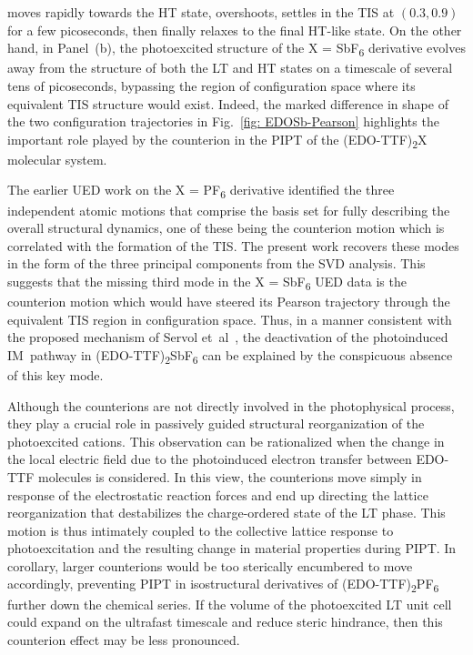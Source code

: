 moves rapidly towards the HT state, overshoots, settles in the TIS at $(0.3, 0.9)$
for a few picoseconds, then finally relaxes to the final HT-like state.
%
On the other hand, in Panel~(b), the photoexcited structure of the X = SbF\textsubscript{6} derivative
evolves away from the structure of both the LT and HT states on a timescale of several tens of picoseconds,
bypassing the region of configuration space where its equivalent TIS structure would exist.
%
Indeed, the marked difference in shape of the two configuration trajectories
in Fig.~\ref{fig: EDOSb-Pearson} highlights the important role played by the counterion
in the PIPT of the (EDO-TTF)\textsubscript{2}X molecular system.

The earlier UED work on the X = PF\textsubscript{6} derivative
identified the three independent atomic motions that comprise the basis set for
fully describing the overall structural dynamics, one of these being the counterion motion
which is correlated with the formation of the TIS.
%
The present work recovers these modes in the form of the three principal components from the SVD analysis.
This suggests that the missing third mode in the X = SbF\textsubscript{6} UED data is
the counterion motion which would have steered its Pearson trajectory through the equivalent TIS region
in configuration space.
%
Thus, in a manner consistent with the proposed mechanism of Servol et~al~\cite{Servol2015},
the deactivation of the photoinduced IM~pathway in (EDO-TTF)\textsubscript{2}SbF\textsubscript{6} can be
explained by the conspicuous absence of this key mode.

Although the counterions are not directly involved in the photophysical process,
they play a crucial role in passively guided structural reorganization of the photoexcited cations.
This observation can be rationalized when the change in the local electric field due to
the photoinduced electron transfer between EDO-TTF molecules is considered.
%
In this view, the counterions move simply in response of the electrostatic reaction forces
and end up directing the lattice reorganization that destabilizes the charge-ordered state of the LT phase.
This motion is thus intimately coupled to the collective lattice response to photoexcitation
and the resulting change in material properties during PIPT.
In corollary, larger counterions would be too sterically encumbered to move accordingly,
preventing PIPT in isostructural derivatives of (EDO-TTF)\textsubscript{2}PF\textsubscript{6}
further down the chemical series. If the volume of the photoexcited LT unit cell could expand
on the ultrafast timescale and reduce steric hindrance, then this counterion effect may be less pronounced.

